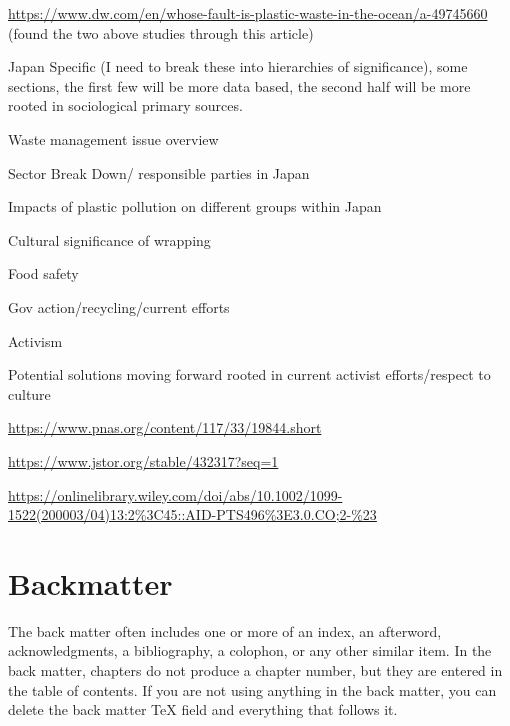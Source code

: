 \documentclass{book}\usepackage{knitr}
\begin{document}
\url{https://www.dw.com/en/whose-fault-is-plastic-waste-in-the-ocean/a-49745660} (found the two above studies through this article)

Japan Specific (I need to break these into hierarchies of significance), some sections, the first  few will be more data based, the second half will be more rooted in sociological primary sources.

Waste management issue overview

Sector Break Down/ responsible parties in Japan

Impacts of plastic pollution on different groups within Japan

Cultural significance of wrapping

Food safety

Gov action/recycling/current efforts

Activism

Potential solutions moving forward rooted in current activist efforts/respect to culture

\url{https://www.pnas.org/content/117/33/19844.short}

\url{https://www.jstor.org/stable/432317?seq=1}

\url{https://onlinelibrary.wiley.com/doi/abs/10.1002/1099-1522(200003/04)13:2%3C45::AID-PTS496%3E3.0.CO;2-%23}






\backmatter

\part{Backmatter}

The back matter often includes one or more of an index, an afterword, acknowledgments, a bibliography, a colophon, or any other similar item. In the back matter, chapters do not produce a chapter number, but they are entered in the table of contents. If you are not using anything in the back matter, you can delete the back matter TeX field and everything that follows it.

\printglossary

\renewcommand\bibname{References}
\setlength{\bibsep}{2\baselineskip}
\setlength\bibindent{.5in}


\end{document}
